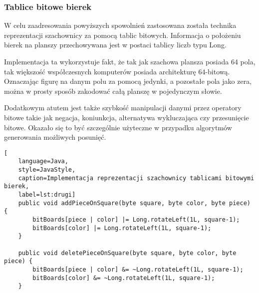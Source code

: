 \subsubsection{Tablice bitowe bierek}

W celu zaadresowania powyższych spowolnień zastosowana została technika reprezentacji szachownicy za pomocą tablic bitowych.
Informacja o położeniu bierek na planszy przechowywana jest w postaci tablicy liczb typu Long.

Implementacja ta wykorzystuje fakt, że tak jak szachowa plansza posiada 64 pola, tak większość współczesnych komputerów posiada architekturę 64-bitową.
Oznaczając figurę na danym polu za pomocą jedynki, a pozostałe pola jako zera, można w prosty sposób zakodować całą planszę w pojedynczym słowie.

Dodatkowym atutem jest także szybkość manipulacji danymi przez operatory bitowe takie jak negacja, koniunkcja, alternatywa wykluczająca czy przesunięcie bitowe.
Okazało się to być szczególnie użyteczne w przypadku algorytmów generowania możliwych posunięć.
\begin{lstlisting}[
    language=Java,
    style=JavaStyle,
    caption=Implementacja reprezentacji szachownicy tablicami bitowymi bierek,
    label=lst:drugi]
    public void addPieceOnSquare(byte square, byte color, byte piece) {
        bitBoards[piece | color] |= Long.rotateLeft(1L, square-1);
        bitBoards[color] |= Long.rotateLeft(1L, square-1);
    }

    public void deletePieceOnSquare(byte square, byte color, byte piece) {
        bitBoards[piece | color] &= ~Long.rotateLeft(1L, square-1);
        bitBoards[color] &= ~Long.rotateLeft(1L, square-1);
    }
\end{lstlisting}

